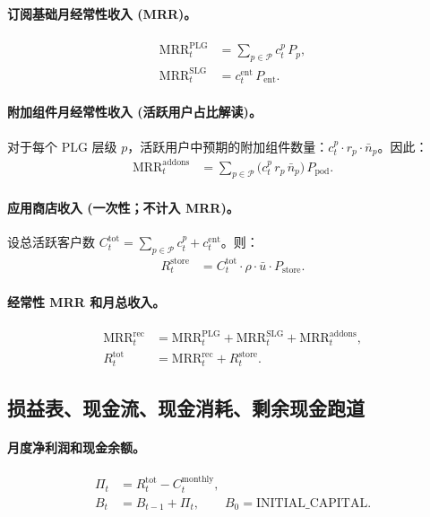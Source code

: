 \documentclass[11pt, a4paper, oneside]{article}
\begin{document}
\paragraph{订阅基础月经常性收入 (MRR)。}
\begin{align}
\mathrm{MRR}^{\mathrm{PLG}}_t &= \sum_{p \in \mathcal{P}} c^p_t \, P_p,\\
\mathrm{MRR}^{\mathrm{SLG}}_t &= c^{\mathrm{ent}}_t \, P_{\mathrm{ent}}.
\end{align}

\paragraph{附加组件月经常性收入 (活跃用户占比解读)。}
对于每个 PLG 层级 $p$，活跃用户中预期的附加组件数量：$c^p_t \cdot r_p \cdot \bar{n}_p$。因此：
\begin{align}
\mathrm{MRR}^{\mathrm{addons}}_t 
  &= \sum_{p \in \mathcal{P}} \bigl(c^p_t \, r_p \, \bar{n}_p\bigr)\, P_{\mathrm{pod}}.
\end{align}

\paragraph{应用商店收入 (一次性；不计入 MRR)。}
设总活跃客户数 $C^{\mathrm{tot}}_t = \sum_{p \in \mathcal{P}} c^p_t + c^{\mathrm{ent}}_t$。则：
\begin{align}
R^{\mathrm{store}}_t 
  &= C^{\mathrm{tot}}_t \cdot \rho \cdot \bar{u} \cdot P_{\mathrm{store}}.
\end{align}

\paragraph{经常性 MRR 和月总收入。}
\begin{align}
\mathrm{MRR}^{\mathrm{rec}}_t 
  &= \mathrm{MRR}^{\mathrm{PLG}}_t + \mathrm{MRR}^{\mathrm{SLG}}_t + \mathrm{MRR}^{\mathrm{addons}}_t,\\
R^{\mathrm{tot}}_t 
  &= \mathrm{MRR}^{\mathrm{rec}}_t + R^{\mathrm{store}}_t.
\end{align}

\subsection{损益表、现金流、现金消耗、剩余现金跑道}
\paragraph{月度净利润和现金余额。}
\begin{align}
\Pi_t &= R^{\mathrm{tot}}_t - C^{\mathrm{monthly}}_t,\\
B_t &= B_{t-1} + \Pi_t, \qquad B_0 = \text{INITIAL\_CAPITAL}.
\end{align}
\end{document}
